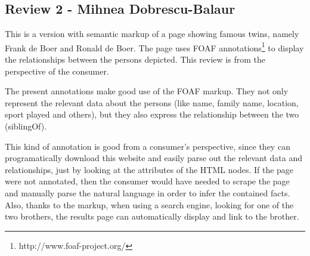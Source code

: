 \documentclass{acm_proc_10ptArticle-sp}
\begin{document}
\subsection{Review 2 - Mihnea Dobrescu-Balaur}
This is a version with semantic markup of a page showing famous twins, namely Frank de Boer and Ronald de Boer. The page uses FOAF annotations\footnote{http://www.foaf-project.org/} to display the relationships between the persons depicted. This review is from the perspective of the consumer.

The present annotations make good use of the FOAF markup. They not only represent the relevant data about the persons (like name, family name, location, sport played and others), but they also express the relationship between the two (siblingOf).

This kind of annotation is good from a consumer’s perspective, since they can programatically download this website and easily parse out the relevant data and relationships, just by looking at the attributes of the HTML nodes. If the page were not annotated, then the consumer would have needed to scrape the page and manually parse the natural language in order to infer the contained facts. Also, thanks to the markup, when using a search engine, looking for one of the two brothers, the results page can automatically display and link to the brother.




\end{document}
